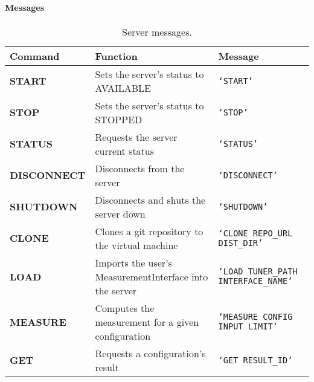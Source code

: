\paragraph{Messages}
\begin{table}[htpb]
    \centering
    \scriptsize
    \begin{tabular}{@{}p{2.1cm}p{4cm}p{6cm}@{}}
        \toprule
        {\bf Command} & {\bf Function} & {\bf Message} \\ \midrule
        {\scriptsize \bf START} &
        {\scriptsize Sets the server's status to AVAILABLE} &
        {\scriptsize \tt \lq{}START\rq{}} \\
        \addlinespace{}
        {\scriptsize \bf STOP} &
        {\scriptsize Sets the server's status to STOPPED} &
        {\scriptsize \tt \lq{}STOP\rq{}} \\
        \addlinespace{}
        {\scriptsize \bf STATUS} &
        {\scriptsize Requests the server current status} &
        {\scriptsize \tt \lq{}STATUS\rq{}} \\
        \addlinespace{}
        {\scriptsize \bf DISCONNECT} &
        {\scriptsize Disconnects from the server} &
        {\scriptsize \tt \lq{}DISCONNECT\rq{}} \\
        \addlinespace{}
        {\scriptsize \bf SHUTDOWN} &
        {\scriptsize Disconnects and shuts the server down} &
        {\scriptsize \tt \lq{}SHUTDOWN\rq{}} \\
        \addlinespace{}
        {\scriptsize \bf CLONE} &
        {\scriptsize Clones a git repository to the virtual machine} &
        {\scriptsize \tt \lq{}CLONE REPO\_URL DIST\_DIR\rq{}} \\
        \addlinespace{}
        {\scriptsize \bf LOAD} &
        {\scriptsize Imports the user's MeasurementInterface into the server} &
        {\scriptsize \tt \lq{}LOAD TUNER\_PATH INTERFACE\_NAME\rq{}} \\
        \addlinespace{}
        {\scriptsize \bf MEASURE} &
        {\scriptsize Computes the measurement for a given configuration} &
        {\scriptsize \tt \lq{}MEASURE CONFIG INPUT LIMIT\rq{}} \\
        \addlinespace{}
        {\scriptsize \bf GET} &
        {\scriptsize Requests a configuration's result} &
        {\scriptsize \tt \lq{}GET RESULT\_ID\rq{}} \\ \bottomrule
    \end{tabular}
    \caption{Server messages.}
    \label{tab:protocol-messages}
\end{table}

